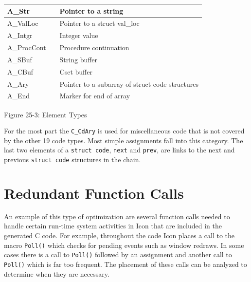 \begin{center}
\tabletail{}
\tablelasttail{}
\begin{xtabular}{|m{0.93935984in}|m{0.41775984in}|m{3.12266in}|}
\hline
 A\_Str &
 &
 Pointer to a string\\\hline
 A\_ValLoc &
 &
 Pointer to a struct val\_loc\\\hline
 A\_Intgr &
 &
 Integer value\\\hline
 A\_ProcCont &
 &
 Procedure continuation\\\hline
 A\_SBuf &
 &
 String buffer\\\hline
 A\_CBuf &
 &
 Cset buffer\\\hline
 A\_Ary &
 &
 Pointer to a subarray of struct code structures\\\hline
 A\_End &
 &
 Marker for end of array\\\hline
\end{xtabular}
\end{center}
{\centering{}
Figure 25-3: Element Types
\par}

For the most part the \texttt{C\_CdAry} is used for miscellaneous code
that is not covered by the other 19 code types. Most simple
assignments fall into this category. The last two elements of a
\texttt{struct code}, \texttt{next} and \texttt{prev}, are links to
the next and previous \texttt{struct code} structures in the chain.


\bigskip


\section{Redundant Function Calls}

An example of this type of optimization are several function calls
needed to handle certain run-time system activities in Icon that are
included in the generated C code. For example, throughout the code
Icon places a call to the macro \texttt{Poll()} which checks for
pending events such as window redraws. In some cases there is a call
to \texttt{Poll()} followed by an assignment and another call to
\texttt{Poll()} which is far too frequent. The placement of these
calls can be analyzed to determine when they are necessary.

